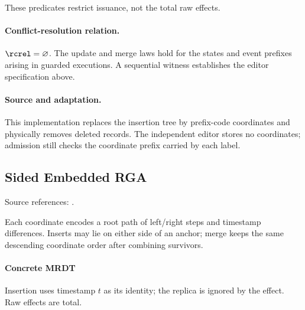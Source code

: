 These predicates restrict issuance, not the total raw effects.


\paragraph{Conflict-resolution relation.}
$\rcrel=\varnothing$. The update and merge laws hold for the states and event prefixes arising in guarded executions. A sequential witness establishes the editor specification above.


\paragraph{Source and adaptation.}
This implementation replaces the insertion tree by prefix-code coordinates and physically removes deleted records. The independent editor stores no coordinates; admission still checks the coordinate prefix carried by each label.


\subsection{Sided Embedded RGA}
\label{app:dt-sided-embed-rga}

\noindent Source references: \cite{Roh,FugueMax}.








Each coordinate encodes a root path of left/right steps and timestamp differences. Inserts may lie on either side of an anchor; merge keeps the same descending coordinate order after combining survivors.

\paragraph{Concrete MRDT}
Insertion uses timestamp $t$ as its identity; the replica is ignored by the effect. Raw effects are total.

